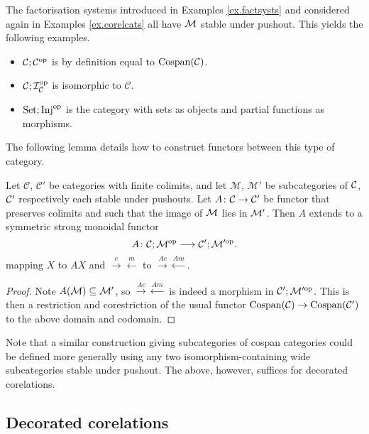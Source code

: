 \begin{examples} 
  The factorisation systems introduced in Examples \ref{ex.factsysts} and
  considered again in Examples \ref{ex.corelcats} all have $\mathcal M$ stable under
  pushout. This yields the following examples.
  \begin{itemize}
    \item $\mathcal C; \mathcal C^{\mathrm{op}}$ is by definition equal to
      $\operatorname{{Cospan}}(\mathcal C)$.
    \item $\mathcal C;\mathcal I_{\mathcal C}^{\mathrm{op}}$ is isomorphic to $\mathcal C$.
    \item $\mathrm{Set};\mathrm{Inj}^{\mathrm{op}}$ is the category with sets as objects and partial
      functions as morphisms.
  \end{itemize}
\end{examples}

The following lemma details how to construct functors between this type of
category.

\begin{lemma} \label{lem.madjointsfunctor}
  Let $\mathcal C$, $\mathcal C'$ be categories with finite colimits, and let
  $\mathcal M$, $\mathcal M'$ be subcategories of $\mathcal C$, $\mathcal C'$ respectively
  each stable under pushouts. Let $A{\colon} \mathcal C \to \mathcal C'$ be functor that
  preserves colimits and such that the image of $\mathcal M$ lies in $\mathcal M'$. Then
  $A$ extends to a symmetric strong monoidal functor
  \[
    A{\colon} \mathcal C;\mathcal M^{\mathrm{op}} \longrightarrow \mathcal C'; \mathcal M'^{\mathrm{op}}.
  \]
  mapping $X$ to $AX$ and $\stackrel{c}\rightarrow \stackrel{m}\leftarrow$ to
  $\stackrel{Ac}\rightarrow \stackrel{Am}\leftarrow$.
\end{lemma}
\begin{proof}
  Note $A(\mathcal M) \subseteq \mathcal M'$, so $\stackrel{Ac}\rightarrow
  \stackrel{Am}\leftarrow$ is indeed a morphism in $\mathcal C';\mathcal M'^{\mathrm{op}}$. This is
  then a restriction and corestriction of the usual functor $\operatorname{{Cospan}}(\mathcal C) \to
  \operatorname{{Cospan}}(\mathcal C')$ to the above domain and codomain.
\end{proof}

Note that a similar construction giving subcategories of cospan categories could
be defined more generally using any two isomorphism-containing wide
subcategories stable under pushout.  The above, however, suffices for decorated
corelations.

\subsection{Decorated corelations} \label{ssec.deccorel}

